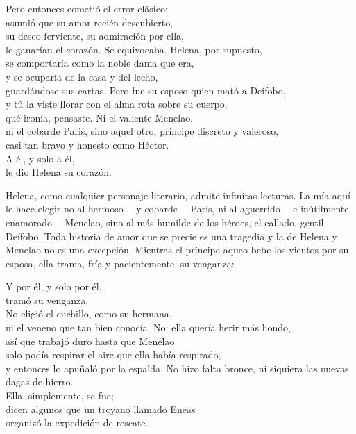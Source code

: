 \begin{versopropio}
Pero entonces cometió el error clásico:\\
asumió que su amor recién descubierto,\\
su deseo ferviente, su admiración por ella,\\
le ganarían el corazón.
\stanzabreak
Se equivocaba. Helena, por supuesto,\\
se comportaría como la noble dama que era,\\
y se ocuparía de la casa y del lecho,\\
guardándose sus cartas.
\stanzabreak
Pero fue su esposo quien mató a Deífobo,\\
y tú la viste llorar con el alma rota sobre su cuerpo,\\
qué ironía, pensaste. Ni el valiente Menelao,\\
ni el cobarde Paris, sino aquel otro,
\stanzabreak
príncipe discreto y valeroso,\\
casi tan bravo y honesto como Héctor.\\
A él, y solo a él,\\
le dio Helena su corazón.
\end{versopropio}

Helena, como cualquier personaje literario, admite infinitas lecturas. La mía aquí le hace elegir no al hermoso ---y cobarde--- Paris, ni al aguerrido ---e inútilmente enamorado--- Menelao, sino al más humilde de los héroes, el callado, gentil Deífobo. Toda historia de amor que se precie es una tragedia y la de Helena y Menelao no es una excepción. Mientras el príncipe aqueo bebe los vientos por su esposa, ella trama, fría y pacientemente, su venganza:

\begin{versopropio}
Y por él, y solo por él,\\
tramó su venganza.\\
No eligió el cuchillo, como su hermana,\\
ni el veneno que tan bien conocía.
\stanzabreak
No: ella quería herir más hondo,\\
así que trabajó duro hasta que Menelao\\
solo podía respirar el aire que ella había respirado,\\
y entonces lo apuñaló por la espalda.
\stanzabreak
No hizo falta bronce, ni siquiera las nuevas dagas de hierro.\\
Ella, simplemente, se fue;\\
dicen algunos que un troyano llamado Eneas\\
organizó la expedición de rescate.
\end{versopropio}

